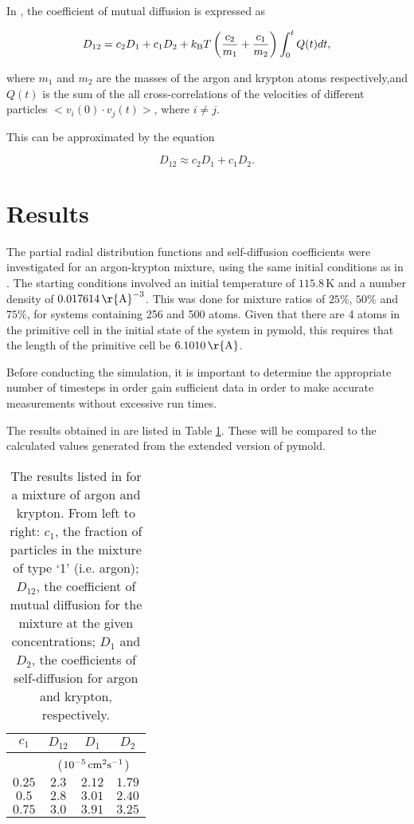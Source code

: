 \documentclass{article}
\begin{document}
In \cite{StructureAndDiffusion}, the coefficient of mutual diffusion is expressed as

\begin{equation}
D_{12} = c_2 D_1 + c_1 D_2 + k_{\rm{B}}T\left( \frac{c_2}{m_1} + \frac{c_1}{m_2} \right)\int_{0}^{t}Q(t)dt,
\end{equation}

where $m_1$ and $m_2$ are the masses of the argon and krypton atoms respectively,and $Q(t)$ is the sum of the all cross-correlations of the velocities of different particles $<v_i(0)\cdot v_j(t)>$, where $i\neq j$.

This can be approximated by the equation

\begin{equation}
D_{12} \approx c_2 D_1 + c_1 D_2.
\end{equation}

\section{Results}

The partial radial distribution functions and self-diffusion coefficients were investigated for an argon-krypton mixture, using the same initial conditions as in \cite{StructureAndDiffusion}. The starting conditions involved an initial temperature of $115.8\,$K and a number density of $0.017614\,\rm{\r{A}}^{-3}$. This was done for mixture ratios of $25\%$, $50\%$ and $75\%$, for systems containing 256 and 500 atoms.
Given that there are 4 atoms in the primitive cell in the initial state of the system in pymold, this requires that the length of the primitive cell be $6.1010\,\rm{\r{A}}$.

Before conducting the simulation, it is important to determine the appropriate number of timesteps in order gain sufficient data in order to make accurate measurements without excessive run times.


The results obtained in \cite{StructureAndDiffusion} are listed in Table \ref{table:comparisonResults}. These will be compared to the calculated values generated from the extended version of pymold.

\begin{table}[h!t]
\centering
\caption{ The results listed in \cite{StructureAndDiffusion} for a mixture of argon and krypton. From left to right: $c_1$, the fraction of particles in the mixture of type `1' (i.e. argon); $D_{12}$, the coefficient of mutual diffusion for the mixture at the given concentrations; $D_{1}$ and $D_2$, the coefficients of self-diffusion for argon and krypton, respectively. \label{table:comparisonResults}}
\begin{tabular}{|c|c|c|c|} 
\hline
$c_1$ & $D_{12}$ & $D_1$ & $D_2$\\\hline
& \multicolumn{3}{|c|}{($10^{-5}\,\rm{cm}^2\rm{s}^{-1}$)}\\\hline
$0.25$ & $2.3$ & $2.12$ & $1.79$\\
$0.5$ & $2.8$ & $3.01$ & $2.40$\\
$0.75$ & $3.0$ & $3.91$ & $3.25$\\\hline
\end{tabular}
\end{table} 
\end{document}
